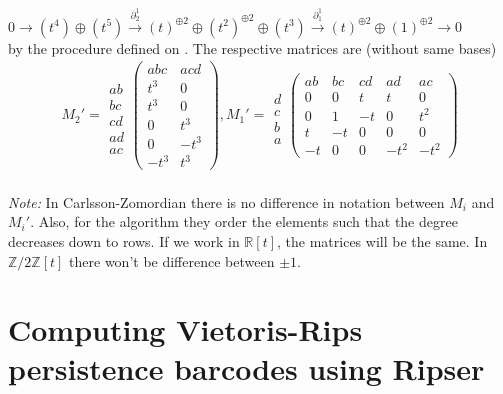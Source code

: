 \documentclass[11pt,a4paper]{report}
\begin{document}
              $0 \rightarrow (t^4)\oplus(t^5) \xrightarrow{\partial_2^1} (t)^{\oplus2}\oplus(t^2)^{\oplus2}\oplus(t^3) \xrightarrow{\partial_1^1} (t)^{\oplus2}\oplus(1)^{\oplus2} \rightarrow 0$\\
              by the procedure defined on \cite{Zomorodian_Carlsson_2005}. The respective matrices are (without same bases)
              \begin{align*}
                M_2' = \begin{array}{c}\\ab\\bc\\cd\\ad\\ac\end{array}\left(\begin{array}{cc}abc&acd\\t^3&0\\t^3&0\\0&t^3\\0&-t^3\\-t^3&t^3\end{array}\right), M_1' = \begin{array}{c}\\d\\c\\b\\a\end{array}\left(\begin{array}{ccccc}ab&bc&cd&ad&ac\\0&0&t&t&0\\0&1&-t&0&t^2\\t&-t&0&0&0\\-t&0&0&-t^2&-t^2\end{array}\right)
              \end{align*}
              \\
              \emph{Note:} In Carlsson-Zomordian there is no difference in notation between $M_i$ and $M_i'$. Also, for the algorithm they order the elements such that the degree decreases down to rows. If we work in $\mathbb{R}[t]$, the matrices will be the same. In $\mathbb{Z}/2\mathbb{Z}[t]$ there won't be difference between $\pm 1$.\\
              
            \section{Computing Vietoris-Rips persistence barcodes using Ripser} \label{ripser_sec}
\end{document}
